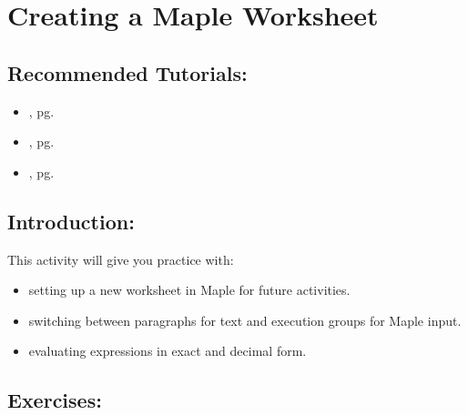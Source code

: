 \section{Creating a Maple Worksheet}
\label{sec:creating_a_maple_worksheet}	

\subsection*{Recommended Tutorials:}
\begin{itemize}[noitemsep]
	\item {}, pg. \pageref{chp:maple_environment}
	\item {}, pg. \pageref{chp:basics_of_maple_syntax}
		\item {}, pg. \pageref{chp:basic_operations}
\end{itemize}

\subsection*{Introduction:}

This activity will give you practice with:
\begin{itemize}
\item setting up a new worksheet in Maple for future activities.
\item switching between paragraphs for text and execution groups for Maple input.
\item evaluating expressions in exact and decimal form.
\end{itemize}

\subsection*{Exercises:}

